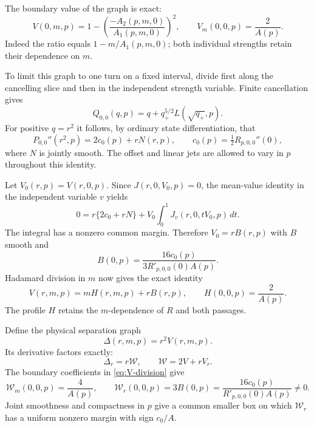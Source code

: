 The boundary value of the graph is exact:
\begin{equation}\label{eq:V-boundary}
 V(0,m,p)=1-\left(\frac{-A_2(p,m,0)}{A_1(p,m,0)}\right)^2,
 \qquad V_m(0,0,p)=\frac{2}{A(p)}.
\end{equation}
Indeed the ratio equals \(1-m/A_1(p,m,0)\); both individual strengths
retain their dependence on \(m\).

To limit this graph to one turn on a fixed interval, divide first along
the cancelling slice and then in the independent strength variable.
Finite cancellation gives
\begin{equation}\label{eq:Q-aligned}
 Q_{0,0}(q,p)=q+q_+^{5/2}L(\sqrt{q_+},p).
\end{equation}
For positive \(q=r^2\) it follows, by ordinary state differentiation,
that
\begin{equation}\label{eq:center-curvature}
 P_{0,0}''(r^2,p)=2c_0(p)+rN(r,p),\qquad
 c_0(p)=\tfrac12R_{p,0,0}''(0),
\end{equation}
where \(N\) is jointly smooth. The offset and linear jets are allowed
to vary in \(p\) throughout this identity.

Let \(V_0(r,p)=V(r,0,p)\). Since \(J(r,0,V_0,p)=0\), the mean-value
identity in the independent variable \(v\) yields
\[
 0=r\{2c_0+rN\}
       +V_0\int_0^1J_v(r,0,tV_0,p)\,dt.
\]
The integral has a nonzero common margin. Therefore \(V_0=rB(r,p)\)
with \(B\) smooth and
\begin{equation}\label{eq:B-boundary}
 B(0,p)=\frac{16c_0(p)}{3R'_{p,0,0}(0)A(p)}.
\end{equation}
Hadamard division in \(m\) now gives the exact identity
\begin{equation}\label{eq:V-division}
 V(r,m,p)=mH(r,m,p)+rB(r,p),\qquad
 H(0,0,p)=\frac{2}{A(p)}.
\end{equation}
The profile $H$ retains the $m$-dependence of $R$ and both passages.

Define the physical separation graph
\begin{equation}\label{eq:Delta-definition}
 \Delta(r,m,p)=r^2V(r,m,p).
\end{equation}
Its derivative factors exactly:
\begin{equation}\label{eq:Delta-derivative}
 \Delta_r=r\mathcal W,\qquad \mathcal W=2V+rV_r.
\end{equation}
The boundary coefficients in \eqref{eq:V-division} give
\begin{equation}\label{eq:W-boundary}
 \mathcal W_m(0,0,p)=\frac4{A(p)},\qquad
 \mathcal W_r(0,0,p)=3B(0,p)
   =\frac{16c_0(p)}{R'_{p,0,0}(0)A(p)}\ne0.
\end{equation}
Joint smoothness and compactness in \(p\) give a common smaller box
on which \(\mathcal W_r\) has a uniform nonzero margin with sign
\(c_0/A\).

